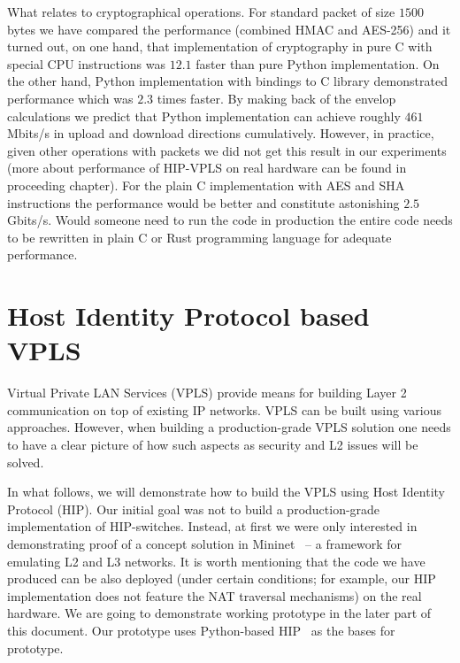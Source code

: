 What relates to cryptographical operations. For standard packet of size $1500$ 
bytes we have compared the performance (combined HMAC and AES-256) and it turned 
out, on one hand, that implementation of cryptography in pure C with special CPU instructions was 
$12.1$ faster than pure Python implementation. On the other hand, Python implementation with bindings
to C library demonstrated performance which was $2.3$ times faster. By making back of the envelop calculations
we predict that Python implementation can achieve roughly $461$ Mbits/s in upload and download directions
cumulatively. However, in practice, given other operations with packets we did not get this result 
in our experiments (more about performance of HIP-VPLS on real hardware can be found in proceeding 
chapter). For the plain C implementation with AES and SHA instructions the performance would be 
better and constitute astonishing $2.5$ Gbits/s. Would someone need to run the code in production
the entire code needs to be rewritten in plain C or Rust programming language for adequate performance.

\section{Host Identity Protocol based VPLS}

Virtual Private LAN Services (VPLS) provide means for building Layer 2 communication 
on top of existing IP networks. VPLS can be built using various approaches. However, 
when building a production-grade VPLS solution one needs to have a clear picture of 
how such aspects as security and L2 issues will be solved.

In what follows, we will demonstrate how to build the VPLS using Host Identity Protocol (HIP). 
Our initial goal was not to build a production-grade implementation of HIP-switches. Instead, 
at first we were only interested in demonstrating proof of a concept solution in 
Mininet~\cite{mininet} – a framework for emulating L2 and L3 networks. It is worth mentioning that the code 
we have produced can be also deployed (under certain conditions; for example, our HIP implementation 
does not feature the NAT traversal mechanisms) on the real hardware. We are going to demonstrate 
working prototype in the later part of this document. Our prototype uses Python-based HIP~\cite{pyhip} 
as the bases for prototype.

